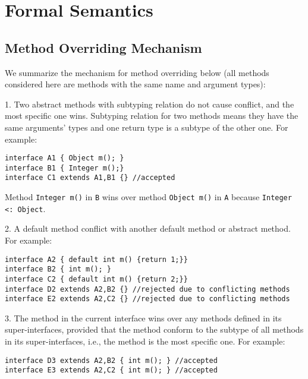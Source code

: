 \section{Formal Semantics}\label{sec:formal}

\subsection{Method Overriding Mechanism}
We summarize the mechanism for method overriding below (all methods considered
here are methods with the same name and argument types):

1. Two abstract methods with subtyping relation do not cause conflict, and the
most specific one wins. Subtyping relation for two methods means they have the
same arguments' types and one return type is a subtype of the other one. For
example:
\begin{lstlisting}
interface A1 { Object m(); }
interface B1 { Integer m();}
interface C1 extends A1,B1 {} //accepted
\end{lstlisting}
Method \texttt{Integer m()} in \texttt{B} wins over method \texttt{Object m()}
in \texttt{A} because \texttt{Integer <: Object}.

2. A default method conflict with another default method or abstract method. For
example:
\begin{lstlisting}
interface A2 { default int m() {return 1;}}
interface B2 { int m(); }
interface C2 { default int m() {return 2;}}
interface D2 extends A2,B2 {} //rejected due to conflicting methods
interface E2 extends A2,C2 {} //rejected due to conflicting methods
\end{lstlisting}

3. The method in the current interface wins over any methods defined in its
super-interfaces, provided that the method conform to the subtype of all methods
in its super-interfaces, i.e., the method is the most specific one. For example:
\begin{lstlisting}
interface D3 extends A2,B2 { int m(); } //accepted
interface E3 extends A2,C2 { int m(); } //accepted
\end{lstlisting}

